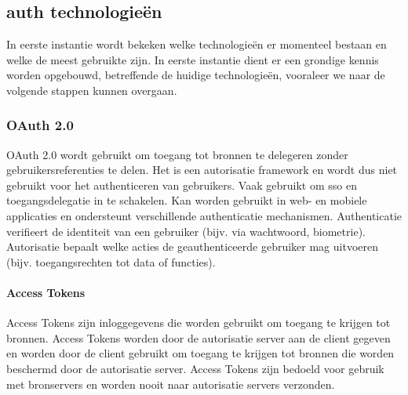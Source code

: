 \chapter{}%
\label{ch:stand-van-zaken}



\section{\gls{auth} technologieën}%
\label{sec:auth-technologieën}
In eerste instantie wordt bekeken welke technologieën er momenteel bestaan en welke de meest gebruikte zijn. In eerste instantie dient er een grondige
kennis worden opgebouwd, betreffende de huidige technologieën, vooraleer we naar de volgende stappen kunnen overgaan.

\subsection{OAuth 2.0}%
\label{subsec:oauth-2.0}
OAuth 2.0 wordt gebruikt om toegang tot bronnen te delegeren zonder gebruikersreferenties te delen. Het is een autorisatie framework en wordt dus niet
gebruikt voor het authenticeren van gebruikers. Vaak gebruikt om \gls{sso} en toegangsdelegatie in te schakelen. Kan worden gebruikt in web-
en mobiele applicaties en ondersteunt verschillende authenticatie mechanismen. \autocite{Hardt2012}
Authenticatie verifieert de identiteit van een gebruiker (bijv. via wachtwoord, biometrie).
Autorisatie bepaalt welke acties de geauthenticeerde gebruiker mag uitvoeren (bijv. toegangsrechten tot data of functies).

\subsubsection{Access Tokens}%
\label{subsubsec:access-tokens}
Access Tokens zijn inloggegevens die worden gebruikt om toegang te krijgen tot bronnen. Access Tokens worden door de autorisatie server aan de client
gegeven en worden door de client gebruikt om toegang te krijgen tot bronnen die worden beschermd door de autorisatie server. Access Tokens zijn bedoeld
voor gebruik met bronservers en worden nooit naar autorisatie servers verzonden.

